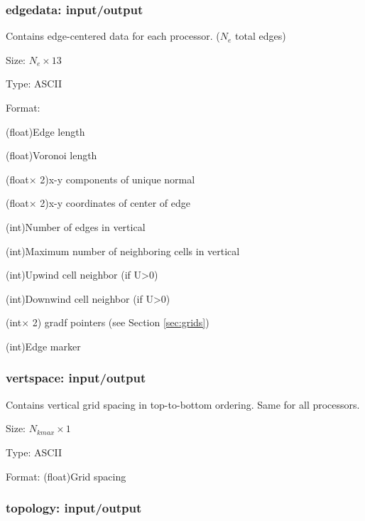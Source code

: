 \documentclass[12pt,oneside]{article}
\begin{document}
\subsubsection{edgedata: input/output}

Contains edge-centered data for each processor. ($N_e$ total edges)
\begin{list}{}
\item Size: $N_e\times 13$
\item Type: ASCII
\item Format:
\begin{list}{}
\item (float)Edge length
\item (float)Voronoi length 
\item (float$\times$ 2)x-y components of unique normal
\item (float$\times$ 2)x-y coordinates of center of edge
\item (int)Number of edges in vertical
\item (int)Maximum number of neighboring cells in vertical
\item (int)Upwind cell neighbor (if U>0)
\item (int)Downwind cell neighbor (if U>0)
\item (int$\times$ 2) gradf pointers (see Section \ref{sec:grids})
\item (int)Edge marker
\end{list}
\end{list}

\subsubsection{vertspace: input/output}

Contains vertical grid spacing in top-to-bottom ordering.  Same for all processors.
\begin{list}{}
\item Size: $N_{kmax}\times 1$
\item Type: ASCII
\item Format: (float)Grid spacing
\end{list}

\subsubsection{topology: input/output}
\end{document}
